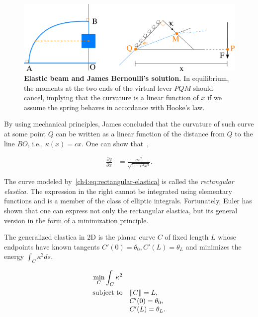 \begin{figure}
\center
\includegraphics[scale=0.36]{figures/chapter4/elastica/james-scheme.png}
\caption{\textbf{Elastic beam and James Bernoulli's solution.} In equilibrium, the moments at the two ends of the virtual lever $PQM$ should cancel, implying that the curvature is a linear function of $x$ if we assume the spring behaves in accordance with Hooke's law.}
\label{ch4:fig:james-scheme-elastica}
\end{figure}

By using mechanical principles, James concluded that the curvature of such curve at some point $Q$ can be written as a linear function of the distance from $Q$ to the line $BO$, i.e., $\kappa(x) = cx$. One can show that~\cite{levien08elastica,truesdell60rational},

\begin{align}
	\frac{\partial y}{\partial x} &= \frac{cx^2}{ \sqrt{1-c^2x^4} }.
	\label{ch4:eq:rectangular-elastica}
\end{align}

The curve modeled by~\cref{ch4:eq:rectangular-elastica} is called the \emph{rectangular elastica}. The expression in the right cannot be integrated using elementary functions and is a member of the class of elliptic integrals. Fortunately, Euler has shown that one can express not only the rectangular elastica, but its general version in the form of a minimization principle. 

The generalized elastica in $2$D is the planar curve $C$ of fixed length $L$ whose endpoints have known tangents $C'(0)=\theta_0,C'(L)=\theta_L$ and minimizes the energy $\int_{C} \kappa^2 ds$.

\begin{align*}
	\begin{array}{rl}
		\displaystyle \min_{C} \int_{C}{\kappa ^2} \\[1em]
		\text{subject to}& \lVert C\rVert = L,\\
		& C'(0) = \theta_0, \\
		& C'(L) = \theta_L.
	\end{array}	
\end{align*}


